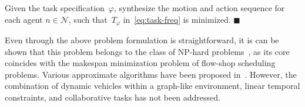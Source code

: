 \begin{problem}\label{prob:formulation}
Given the task specification~$\varphi$,
synthesize the motion and action
sequence for each agent $n\in \mathcal{N}$,
such that~$T_{\varphi}$ in~\eqref{eq:task-freq} is minimized.
\hfill $\blacksquare$
\end{problem}
Even through the above problem formulation is straightforward,
it is can be shown that this problem belongs to the class of NP-hard
problems~\citep{hochba1997approximation},
as its core coincides with the makespan minimization problem
of flow-shop scheduling problems.
Various approximate algorithms have been proposed in~\citep{khamis2015multi}.
However,
the combination of dynamic vehicles within a graph-like environment,
linear temporal constraints,
and collaborative tasks has not been addressed.
